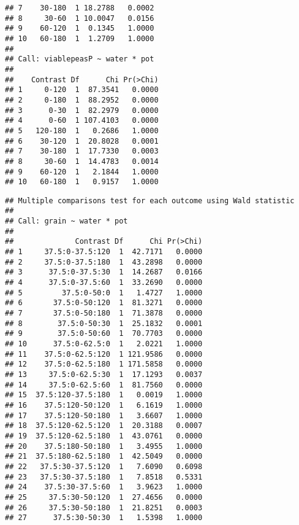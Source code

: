 \begin{knitrout}
\begin{kframe}
\begin{verbatim}
## 7    30-180  1 18.2788   0.0002
## 8     30-60  1 10.0047   0.0156
## 9    60-120  1  0.1345   1.0000
## 10   60-180  1  1.2709   1.0000
## 
## Call: viablepeasP ~ water * pot
## 
##    Contrast Df      Chi Pr(>Chi)
## 1     0-120  1  87.3541   0.0000
## 2     0-180  1  88.2952   0.0000
## 3      0-30  1  82.2979   0.0000
## 4      0-60  1 107.4103   0.0000
## 5   120-180  1   0.2686   1.0000
## 6    30-120  1  20.8028   0.0001
## 7    30-180  1  17.7330   0.0003
## 8     30-60  1  14.4783   0.0014
## 9    60-120  1   2.1844   1.0000
## 10   60-180  1   0.9157   1.0000
\end{verbatim}
\begin{alltt}
\hlstd{(} 
             \hlstd{=} \hlstd{(}\hlstd{(}\hlstd{,} \hlstd{),}
                          \hlstd{(}\hlstd{,} \hlstd{),}
                          \hlstd{(}\hlstd{,} \hlstd{)),}
             
\end{alltt}
\begin{verbatim}
## Multiple comparisons test for each outcome using Wald statistic
## 
## Call: grain ~ water * pot
## 
##              Contrast Df      Chi Pr(>Chi)
## 1     37.5:0-37.5:120  1  42.7171   0.0000
## 2     37.5:0-37.5:180  1  43.2898   0.0000
## 3      37.5:0-37.5:30  1  14.2687   0.0166
## 4      37.5:0-37.5:60  1  33.2690   0.0000
## 5         37.5:0-50:0  1   1.4727   1.0000
## 6       37.5:0-50:120  1  81.3271   0.0000
## 7       37.5:0-50:180  1  71.3878   0.0000
## 8        37.5:0-50:30  1  25.1832   0.0001
## 9        37.5:0-50:60  1  70.7703   0.0000
## 10      37.5:0-62.5:0  1   2.0221   1.0000
## 11    37.5:0-62.5:120  1 121.9586   0.0000
## 12    37.5:0-62.5:180  1 171.5858   0.0000
## 13     37.5:0-62.5:30  1  17.1293   0.0037
## 14     37.5:0-62.5:60  1  81.7560   0.0000
## 15  37.5:120-37.5:180  1   0.0019   1.0000
## 16    37.5:120-50:120  1   6.1619   1.0000
## 17    37.5:120-50:180  1   3.6607   1.0000
## 18  37.5:120-62.5:120  1  20.3188   0.0007
## 19  37.5:120-62.5:180  1  43.0761   0.0000
## 20    37.5:180-50:180  1   3.4955   1.0000
## 21  37.5:180-62.5:180  1  42.5049   0.0000
## 22   37.5:30-37.5:120  1   7.6090   0.6098
## 23   37.5:30-37.5:180  1   7.8518   0.5331
## 24    37.5:30-37.5:60  1   3.9623   1.0000
## 25     37.5:30-50:120  1  27.4656   0.0000
## 26     37.5:30-50:180  1  21.8251   0.0003
## 27      37.5:30-50:30  1   1.5398   1.0000

\end{verbatim}
\end{kframe}
\end{knitrout}
